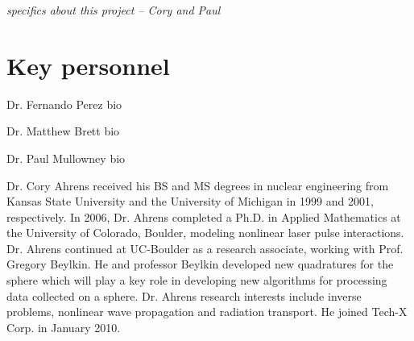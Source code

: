 \documentclass[10pt]{article}
\begin{document}
\emph{specifics about this project -- Cory and Paul}

\section*{Key personnel}

Dr. Fernando Perez bio

Dr. Matthew Brett bio

Dr. Paul Mullowney bio

Dr. Cory Ahrens received his BS and MS degrees in nuclear engineering from Kansas State University and the University of Michigan in 1999 and 2001, respectively. In 2006, Dr. Ahrens completed a Ph.D. in Applied Mathematics at the University of Colorado, Boulder, modeling nonlinear laser pulse interactions. Dr. Ahrens continued at UC-Boulder as a research associate, working with Prof. Gregory Beylkin. He and professor Beylkin developed new quadratures for the sphere which will play a key role in developing new algorithms for processing data collected on a sphere. Dr. Ahrens research interests include inverse problems, nonlinear wave propagation and radiation transport. He joined Tech-X Corp. in January 2010.



 
\end{document}
